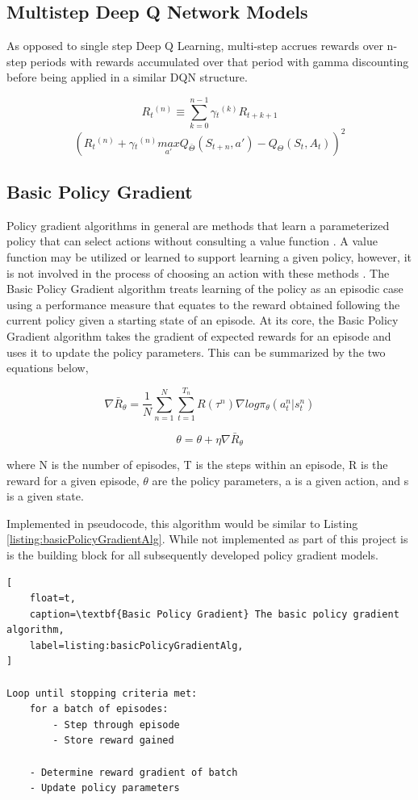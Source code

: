 \documentclass[conference]{IEEEtran}
\begin{document}
\subsection{Multistep Deep Q Network Models}
As opposed to single step Deep Q Learning, multi-step accrues rewards over n-step periods with rewards accumulated over that period with gamma discounting before being applied in a similar DQN structure.

$$R{_{t}}^{(n)} \equiv \sum_{k=0}^{n-1} \gamma {_{t}}^{(k)}R_{t+k+1}$$
$$(R{_{t}}^{(n)} + \gamma {_{t}}^{(n)} \underset{{a}'}{max}Q_{\bar{\Theta }}(S_{t+n},{a}')-Q_{\Theta }(S_{t},A_{t}))^{2}$$

\subsection{Basic Policy Gradient}
Policy gradient algorithms in general are methods that learn a parameterized policy that can select actions without consulting a value function \cite{ReinforcementLearningBook}.
A value function may be utilized or learned to support learning a given policy, however, it is not involved in the process of choosing an action with these methods \cite{ReinforcementLearningBook}.
The Basic Policy Gradient algorithm treats learning of the policy as an episodic case using a performance measure that equates to the reward obtained following the current policy given a starting state of an episode. 
At its core, the Basic Policy Gradient algorithm takes the gradient of expected rewards for an episode and uses it to update the policy parameters.
This can be summarized by the two equations below,

$$\nabla \bar{R}_{\theta} = \frac{1}{N} \sum \limits_{n=1}^N \sum \limits_{t=1}^{T_n} R(\tau^n) \nabla log\pi_{\theta}(a_{t}^n | s_{t}^n)$$

$$\theta = \theta  + \eta \nabla \bar{R}_{\theta}$$

where N is the number of episodes, T is the steps within an episode, R is the reward for a given episode, $\theta$ are the policy parameters, a is a given action, and s is a given state.

Implemented in pseudocode, this algorithm would be similar to Listing \ref{listing:basicPolicyGradientAlg}.
While not implemented as part of this project is is the building block for all subsequently developed policy gradient models.

\begin{lstlisting}[
    float=t,
    caption=\textbf{Basic Policy Gradient} The basic policy gradient algorithm,
    label=listing:basicPolicyGradientAlg,
]

Loop until stopping criteria met:
    for a batch of episodes:
        - Step through episode
        - Store reward gained

    - Determine reward gradient of batch
    - Update policy parameters
\end{lstlisting}
\end{document}
